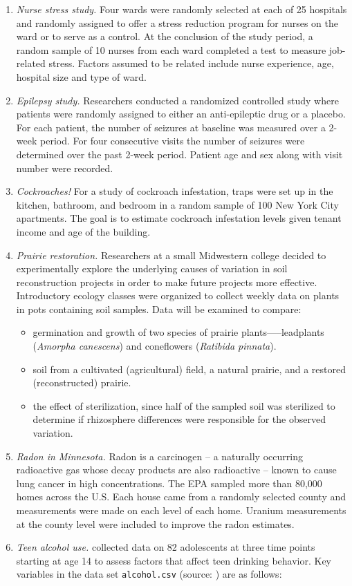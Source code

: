 \documentclass[
]{krantz}
\providecommand{\tightlist}{%
  \setlength{\itemsep}{0pt}\setlength{\parskip}{0pt}}
\begin{document}
\begin{enumerate}
\def\labelenumi{\alph{enumi}.}
\item
  \emph{Nurse stress study.} Four wards were randomly selected at each of 25 hospitals and randomly assigned to offer a stress reduction program for nurses on the ward or to serve as a control. At the conclusion of the study period, a random sample of 10 nurses from each ward completed a test to measure job-related stress. Factors assumed to be related include nurse experience, age, hospital size and type of ward.
\item
  \emph{Epilepsy study.} Researchers conducted a randomized controlled study where patients were randomly assigned to either an anti-epileptic drug or a placebo. For each patient, the number of seizures at baseline was measured over a 2-week period. For four consecutive visits the number of seizures were determined over the past 2-week period. Patient age and sex along with visit number were recorded.
\item
  \emph{Cockroaches!} For a study of cockroach infestation, traps were set up in the kitchen, bathroom, and bedroom in a random sample of 100 New York City apartments. The goal is to estimate cockroach infestation levels given tenant income and age of the building.
\item
  \emph{Prairie restoration.} Researchers at a small Midwestern college decided to experimentally explore the underlying causes of variation in soil reconstruction projects in order to make future projects more effective. Introductory ecology classes were organized to collect weekly data on plants in pots containing soil samples. Data will be examined to compare:

  \begin{itemize}
  \tightlist
  \item
    germination and growth of two species of prairie plants-----leadplants (\emph{Amorpha canescens}) and coneflowers (\emph{Ratibida pinnata}).
  \item
    soil from a cultivated (agricultural) field, a natural prairie, and a restored (reconstructed) prairie.
  \item
    the effect of sterilization, since half of the sampled soil was sterilized to determine if rhizosphere differences were responsible for the observed variation.
  \end{itemize}
\item
  \emph{Radon in Minnesota.} Radon is a carcinogen -- a naturally occurring radioactive gas whose decay products are also radioactive -- known to cause lung cancer in high concentrations. The EPA sampled more than 80,000 homes across the U.S. Each house came from a randomly selected county and measurements were made on each level of each home. Uranium measurements at the county level were included to improve the radon estimates.
\item
  \emph{Teen alcohol use.} \citet{Curran1997} collected data on 82 adolescents at three time points starting at age 14 to assess factors that affect teen drinking behavior. Key variables in the data set \texttt{alcohol.csv} (source: \citet{Singer2003}) are as follows:


\end{enumerate}
\end{document}
